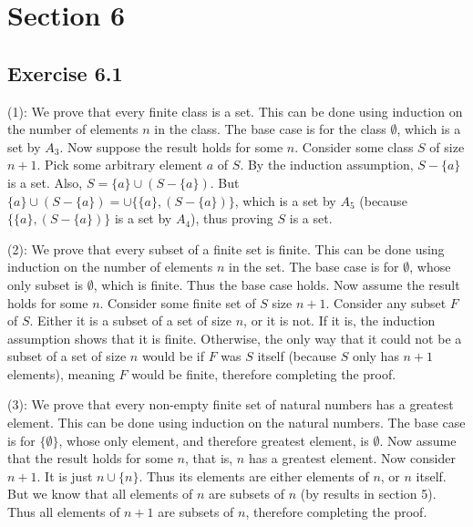 \documentclass{article}
\theoremstyle{definition}
\begin{document}
\section*{Section 6}

\subsection*{Exercise 6.1}
(1): We prove that every finite class is a set. This can be done using induction on the number of elements $n$ in the class. The base case is for the class 
$\emptyset$, which is a set by $A_3$. Now suppose the result holds for some $n$. Consider some class $S$ of size $n+1$. Pick some arbitrary element $a$ of $S$. 
By the induction assumption, $S-\{a\}$ is a set. Also, $S=\{a\}\cup(S-\{a\})$. But 
$\{a\}\cup(S-\{a\})=\cup\{\{a\},(S-\{a\})\}$, which is a set by $A_5$ (because $\{\{a\},(S-\{a\})\}$ is a set by $A_4$), thus proving $S$ is a set.


(2): We prove that every subset of a finite set is finite. This can be done using induction on the number of elements $n$ in the set. The base case is for 
$\emptyset$, whose only subset is $\emptyset$, which is finite. Thus the base case holds. Now assume the result holds for some $n$. Consider some finite set of $S$ 
size $n+1$. Consider any subset $F$ of $S$. Either it is a subset of a set of size $n$, or it is not. If it is, the induction assumption shows that it is finite. Otherwise, 
the only way that it could not be a subset of a set of size $n$ would be if $F$ was $S$ itself (because $S$ only has $n+1$ elements), meaning $F$ would be finite, therefore 
completing the proof.


(3): We prove that every non-empty finite set of natural numbers has a greatest element. This can be done using induction on the natural numbers. 
The base case is for $\{\emptyset\}$, whose only element, and therefore greatest element, is $\emptyset$. Now assume that the result holds for some $n$, that is, 
$n$ has a greatest element. Now consider $n+1$. It is just $n\cup\{n\}$. Thus its elements are either elements of $n$, or $n$ itself. But we know that all elements of $n$ 
are subsets of $n$ (by results in section 5). Thus all elements of $n+1$ are subsets of $n$, therefore completing the proof. 
\end{document}
